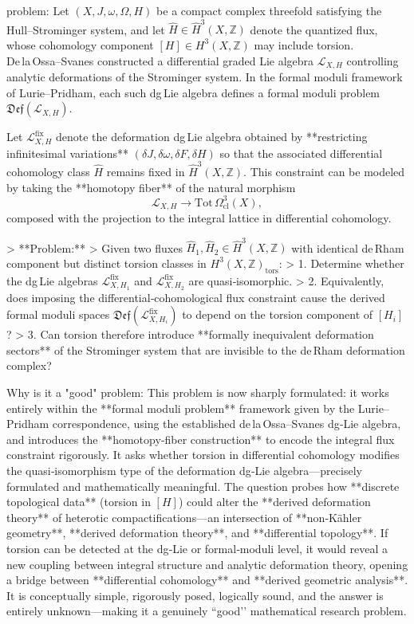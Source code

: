 problem:  
Let \( (X,J,\omega,\Omega,H) \) be a compact complex threefold satisfying the Hull–Strominger system, and let \(\widehat H \in \widehat H^3(X,\mathbb{Z})\) denote the quantized flux, whose cohomology component \([H]\in H^3(X,\mathbb{Z})\) may include torsion.  
De la Ossa–Svanes constructed a differential graded Lie algebra \(\mathcal{L}_{X,H}\) controlling analytic deformations of the Strominger system. In the formal moduli framework of Lurie–Pridham, each such dg Lie algebra defines a formal moduli problem \(\mathfrak{Def}(\mathcal{L}_{X,H})\).  

Let \(\mathcal{L}_{X,H}^{\mathrm{fix}}\) denote the deformation dg Lie algebra obtained by **restricting infinitesimal variations** \((\delta J,\delta\omega,\delta F,\delta H)\) so that the associated differential cohomology class \(\widehat H\) remains fixed in \(\widehat H^3(X,\mathbb{Z})\).  This constraint can be modeled by taking the **homotopy fiber** of the natural morphism  
\[
\mathcal{L}_{X,H}\longrightarrow \mathrm{Tot}\,\Omega^{3}_{\mathrm{cl}}(X),
\]
composed with the projection to the integral lattice in differential cohomology.

> **Problem:**  
> Given two fluxes \(\widehat H_1, \widehat H_2 \in \widehat H^3(X,\mathbb{Z})\) with identical de Rham component but distinct torsion classes in \(H^3(X,\mathbb{Z})_{\mathrm{tors}}\):  
> 1. Determine whether the dg Lie algebras \(\mathcal{L}_{X,H_1}^{\mathrm{fix}}\) and \(\mathcal{L}_{X,H_2}^{\mathrm{fix}}\) are quasi‑isomorphic.  
> 2. Equivalently, does imposing the differential‑cohomological flux constraint cause the derived formal moduli spaces \(\mathfrak{Def}(\mathcal{L}_{X,H_i}^{\mathrm{fix}})\) to depend on the torsion component of \([H_i]\)?  
> 3. Can torsion therefore introduce **formally inequivalent deformation sectors** of the Strominger system that are invisible to the de Rham deformation complex?  

Why is it a "good" problem:  
This problem is now sharply formulated: it works entirely within the **formal moduli problem** framework given by the Lurie–Pridham correspondence, using the established de la Ossa–Svanes dg‑Lie algebra, and introduces the **homotopy‑fiber construction** to encode the integral flux constraint rigorously. It asks whether torsion in differential cohomology modifies the quasi‑isomorphism type of the deformation dg‑Lie algebra—precisely formulated and mathematically meaningful.  
The question probes how **discrete topological data** (torsion in \([H]\)) could alter the **derived deformation theory** of heterotic compactifications—an intersection of **non‑Kähler geometry**, **derived deformation theory**, and **differential topology**. If torsion can be detected at the dg‑Lie or formal‑moduli level, it would reveal a new coupling between integral structure and analytic deformation theory, opening a bridge between **differential cohomology** and **derived geometric analysis**.  
It is conceptually simple, rigorously posed, logically sound, and the answer is entirely unknown—making it a genuinely “good’’ mathematical research problem.